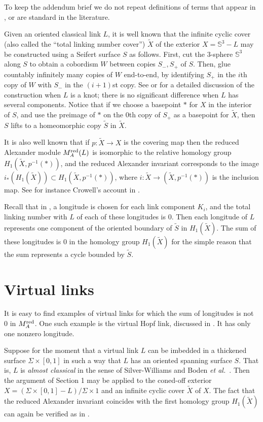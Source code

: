\documentclass[11pt]{article}
\numberwithin{equation}{section}
\theoremstyle{definition}
\def\S{{\mathbb S}}
\newcommand{\Mr}{M_A^{\textup{red}}}
\begin{document}
To keep the addendum brief we do not repeat definitions of terms that appear in \cite{T}, or are standard in the literature.

Given an oriented classical link $L$, it is well known that the infinite cyclic cover (also called the ``total linking number cover'') $\widetilde X$ of the exterior $X=\S^3-L$ may be constructed using a Seifert surface $S$ as follows. First, cut the $3$-sphere $\S^3$ along $S$ to obtain a cobordism $W$ between copies $S_-, S_+$ of $S$. Then, glue countably infinitely many copies of $W$ end-to-end, by identifying $S_+$ in the $i$th copy of $W$ with $S_-$ in the $(i+1)$st copy. See \cite[p.\ 54]{BZ03} or \cite[p.\ 129] {rolfsen} for a detailed discussion of the construction when $L$ is a knot; there is no significant difference when $L$ has several components. Notice that if we choose a basepoint $*$ for $X$ in the interior of $S$, and use the preimage of $*$ on the $0$th copy of $S_+$ as a basepoint for $\widetilde X$, then $S$ lifts to a homeomorphic copy $\widetilde S$ in $\widetilde X$. 


It is also well known that if $p:\widetilde X \to X $ is the covering map then the reduced Alexander module $\Mr(L)$ is isomorphic to the relative homology group $H_1(\widetilde X, p^{-1}(*))$, and the reduced Alexander invariant corresponds to the image  $i_*(H_1(\widetilde X)) \subset H_1(\widetilde X, p^{-1}(*))$, where $i:\widetilde X \to (\widetilde X, p^{-1}(*))$ is the inclusion map. See for instance Crowell's account in \cite{C3}.

Recall that in \cite{T}, a longitude is chosen for each link component $K_i$, and the total linking number with $L$ of each of these longitudes is $0$. Then each longitude of $L$ represents one component of the oriented boundary of $\widetilde S$ in $H_1(\widetilde X)$. The sum of these longitudes is $0$ in the homology group $H_1(\widetilde X)$ for the simple reason that the sum represents a cycle bounded by $\widetilde S$. 


\section{Virtual links}

It is easy to find examples of virtual links for which the sum of longitudes is not $0$ in $\Mr$. One such example is the virtual Hopf link, discussed in \cite[Sec.\ 6]{T}. It has only one nonzero longitude.  

Suppose for the moment that a virtual link $L$ can be imbedded in a thickened surface $\Sigma \times [0,1]$ in such a way that $L$ has an oriented spanning surface $S$. That is, $L$ is \emph{almost classical} in the sense of Silver-Williams \cite{SW} and Boden {\sl et al.\ }\cite{BCK}. Then the argument of Section 1 may be applied to the coned-off exterior $X=(\Sigma \times [0,1] -L )/\Sigma \times 1$ and an infinite cyclic cover $\widetilde X$ of $X$. The fact that the reduced Alexander invariant coincides with the first homology group $H_1(\widetilde X)$ can again be verified as in \cite{C3}.
\end{document}
